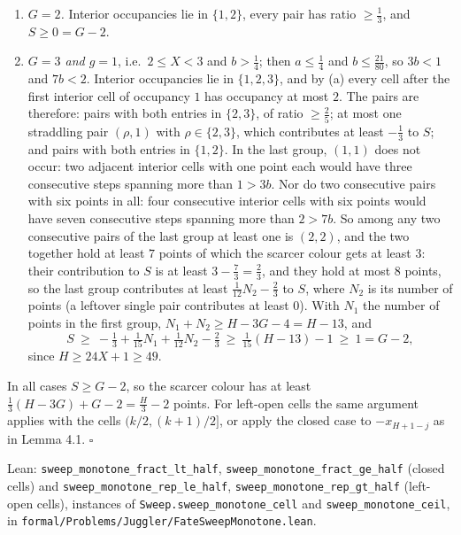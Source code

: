 \documentclass[11pt,a4paper]{article}
\begin{document}
\begin{enumerate}
\item
  \emph{\(G=2\).} Interior occupancies lie in \(\{1,2\}\), every pair
  has ratio \(\ge\tfrac13\), and \(S\ge 0=G-2\).
\item
  \emph{\(G=3\) and \(g=1\)}, i.e.~\(2\le X<3\) and \(b>\tfrac14\); then
  \(a\le\tfrac14\) and \(b\le\tfrac{21}{80}\), so \(3b<1\) and \(7b<2\).
  Interior occupancies lie in \(\{1,2,3\}\), and by (a) every cell after
  the first interior cell of occupancy \(1\) has occupancy at most
  \(2\). The pairs are therefore: pairs with both entries in
  \(\{2,3\}\), of ratio \(\ge\tfrac25\); at most one straddling pair
  \((\rho,1)\) with \(\rho\in\{2,3\}\), which contributes at least
  \(-\tfrac13\) to \(S\); and pairs with both entries in \(\{1,2\}\). In
  the last group, \((1,1)\) does not occur: two adjacent interior cells
  with one point each would have three consecutive steps spanning more
  than \(1>3b\). Nor do two consecutive pairs with six points in all:
  four consecutive interior cells with six points would have seven
  consecutive steps spanning more than \(2>7b\). So among any two
  consecutive pairs of the last group at least one is \((2,2)\), and the
  two together hold at least \(7\) points of which the scarcer colour
  gets at least \(3\): their contribution to \(S\) is at least
  \(3-\tfrac73=\tfrac23\), and they hold at most \(8\) points, so the
  last group contributes at least \(\tfrac1{12}N_2-\tfrac23\) to \(S\),
  where \(N_2\) is its number of points (a leftover single pair
  contributes at least \(0\)). With \(N_1\) the number of points in the
  first group, \(N_1+N_2\ge H-3G-4=H-13\), and \[
  S\ \ge\ -\tfrac13+\tfrac1{15}N_1+\tfrac1{12}N_2-\tfrac23
  \ \ge\ \tfrac1{15}(H-13)-1\ \ge\ 1=G-2,
  \] since \(H\ge 24X+1\ge 49\).
\end{enumerate}

In all cases \(S\ge G-2\), so the scarcer colour has at least
\(\tfrac13(H-3G)+G-2=\tfrac H3-2\) points. For left-open cells the same
argument applies with the cells \((k/2,(k+1)/2]\), or apply the closed
case to \(-x_{H+1-j}\) as in Lemma 4.1. \(\square\)

Lean: \texttt{\nolinkurl{sweep_monotone_fract_lt_half}},
\texttt{\nolinkurl{sweep_monotone_fract_ge_half}} (closed cells) and
\texttt{\nolinkurl{sweep_monotone_rep_le_half}},
\texttt{\nolinkurl{sweep_monotone_rep_gt_half}} (left-open cells),
instances of \texttt{\nolinkurl{Sweep.sweep_monotone_cell}} and
\texttt{\nolinkurl{sweep_monotone_ceil}}, in
\texttt{\nolinkurl{formal/Problems/Juggler/FateSweepMonotone.lean}}.
\end{document}
